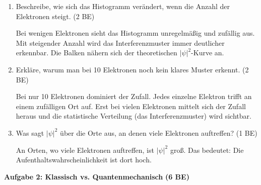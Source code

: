 \documentclass[11pt,a4paper]{article}
\begin{document}
\begin{enumerate}[label=\alph*)]
\item Beschreibe, wie sich das Histogramm verändert, wenn die Anzahl der Elektronen steigt. \hfill (2 BE)

\textcolor{loesung}{Bei wenigen Elektronen sieht das Histogramm unregelmäßig und zufällig aus. Mit steigender Anzahl wird das Interferenzmuster immer deutlicher erkennbar. Die Balken nähern sich der theoretischen $|\psi|^2$-Kurve an.}

\vspace{0.3em}

\item Erkläre, warum man bei 10 Elektronen noch kein klares Muster erkennt. \hfill (2 BE)

\textcolor{loesung}{Bei nur 10 Elektronen dominiert der Zufall. Jedes einzelne Elektron trifft an einem zufälligen Ort auf. Erst bei vielen Elektronen mittelt sich der Zufall heraus und die statistische Verteilung (das Interferenzmuster) wird sichtbar.}

\vspace{0.3em}

\item Was sagt $|\psi|^2$ über die Orte aus, an denen viele Elektronen auftreffen? \hfill (1 BE)

\textcolor{loesung}{An Orten, wo viele Elektronen auftreffen, ist $|\psi|^2$ groß. Das bedeutet: Die Aufenthaltswahrscheinlichkeit ist dort hoch.}

\end{enumerate}

\newpage


{\large\textbf{Aufgabe 2: Klassisch vs. Quantenmechanisch}} \hfill \textbf{(6 BE)}

\vspace{0.5em}
\end{document}
